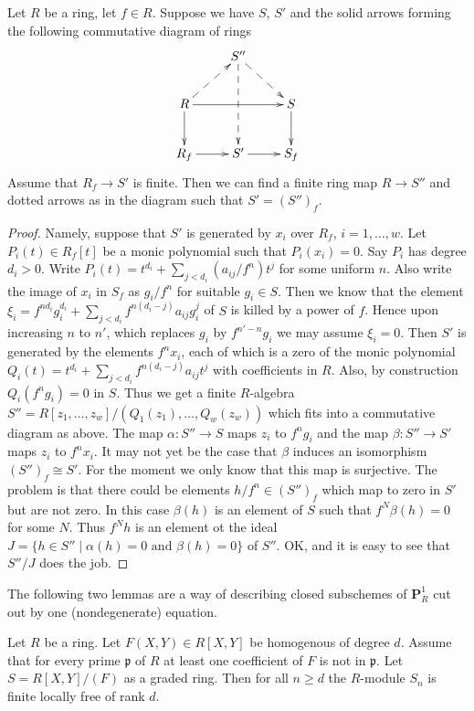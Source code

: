\begin{lemma}
\label{lemma-finite-after-localization}
Let $R$ be a ring, let $f \in R$.
Suppose we have $S$, $S'$ and the solid arrows
forming the following commutative diagram of rings
$$
\xymatrix{
& S'' \ar@{-->}[rd] \ar@{-->}[dd] & 
\\
R \ar[rr] \ar@{-->}[ru] \ar[d] &  & S \ar[d]
\\
R_f \ar[r] & S' \ar[r] & S_f
}
$$
Assume that $R_f \to S'$ is finite. Then we can find
a finite ring map $R \to S''$ and dotted arrows as
in the diagram such that $S' = (S'')_f$.
\end{lemma}

\begin{proof}
Namely, suppose that $S'$ is generated by
$x_i$ over $R_f$, $i=1,\ldots,w$. Let $P_i(t) \in R_f[t]$
be a monic polynomial such that $P_i(x_i) = 0$.
Say $P_i$ has degree $d_i > 0$. Write
$P_i(t) = t^{d_i} + \sum_{j < d_i} (a_{ij}/f^n) t^j$
for some uniform $n$. Also write 
the image of $x_i$ in $S_f$ as $g_i / f^n$
for suitable $g_i \in S$. Then we know
that the element
$\xi_i = f^{nd_i} g_i^{d_i} + \sum_{j < d_i} f^{n(d_i - j)} a_{ij} g_i^j$
of $S$ is killed by a power of $f$.
Hence upon increasing $n$ to $n'$, which replaces 
$g_i$ by $f^{n' - n}g_i$ we may assume $\xi_i = 0$.
Then $S'$ is generated by the elements
$f^n x_i$, each of which is a zero of the
monic polynomial $Q_i(t) = t^{d_i} +
\sum_{j < d_i} f^{n(d_i - j)} a_{ij} t^j$
with coefficients in $R$. Also, by construction
$Q_i(f^ng_i) = 0$ in $S$. Thus we get a finite $R$-algebra
$S'' = R[z_1,\ldots,z_w]/(Q_1(z_1),\ldots,Q_w(z_w))$
which fits into a commutative diagram as above.
The map $\alpha : S'' \to S$ maps $z_i$ to $f^ng_i$ and
the map $\beta : S'' \to S'$ maps $z_i$ to $f^nx_i$. 
It may not yet be the case that $\beta$ induces an
isomorphism $(S'')_f \cong S'$.
For the moment we only know that this map
is surjective. The problem is that there could be
elements $h/f^n \in (S'')_f$ which map to zero
in $S'$ but are not zero. In this case $\beta(h)$
is an element of $S$ such that $f^N \beta(h) = 0$
for some $N$. Thus $f^N h$ is an element ot the ideal
$J = \{h \in S'' \mid \alpha(h) = 0 \text{ and }
\beta(h) = 0\}$ of $S''$. OK, and it is easy to see that
$S''/J$ does the job.
\end{proof}

\noindent
The following two lemmas are a way of describing closed
subschemes of $\mathbf{P}^1_R$ cut out by one (nondegenerate)
equation.

\begin{lemma}
\label{lemma-P1}
Let $R$ be a ring.
Let $F(X,Y) \in R[X,Y]$ be homogenous of degree
$d$. Assume that for every prime $\mathfrak p$ of $R$
at least one coefficient of $F$ is not in $\mathfrak p$.
Let $S = R[X,Y]/(F)$ as a graded ring.
Then for all $n \geq d$ the $R$-module $S_n$
is finite locally free of rank $d$.
\end{lemma}

